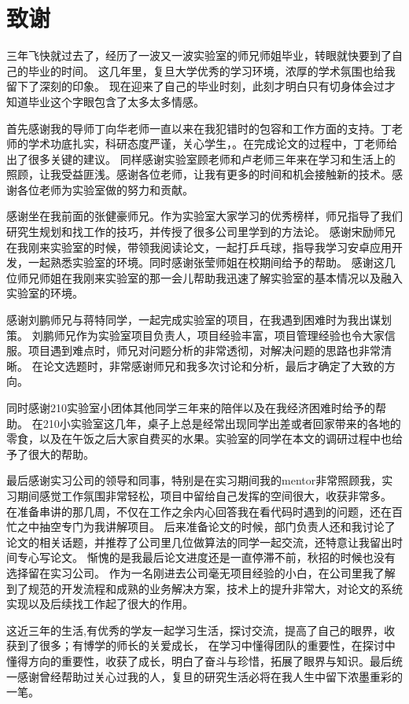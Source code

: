 \chapter*{致谢}

三年飞快就过去了，经历了一波又一波实验室的师兄师姐毕业，转眼就快要到了自己的毕业的时间。 
这几年里，复旦大学优秀的学习环境，浓厚的学术氛围也给我留下了深刻的印象。
现在迎来了自己的毕业时刻，此刻才明白只有切身体会过才知道毕业这个字眼包含了太多太多情感。

首先感谢我的导师丁向华老师一直以来在我犯错时的包容和工作方面的支持。丁老师的学术功底扎实，科研态度严谨，关心学生，。在完成论文的过程中，丁老师给出了很多关键的建议。
同样感谢实验室顾老师和卢老师三年来在学习和生活上的照顾，让我受益匪浅。感谢各位老师，让我有更多的时间和机会接触新的技术。感谢各位老师为实验室做的努力和贡献。

感谢坐在我前面的张健豪师兄。作为实验室大家学习的优秀榜样，师兄指导了我们研究生规划和找工作的技巧，并传授了很多公司里学到的方法论。
感谢宋励师兄在我刚来实验室的时候，带领我阅读论文，一起打乒乓球，指导我学习安卓应用开发，一起熟悉实验室的环境。同时感谢张莹师姐在校期间给予的帮助。
感谢这几位师兄师姐在我刚来实验室的那一会儿帮助我迅速了解实验室的基本情况以及融入实验室的环境。

感谢刘鹏师兄与蒋特同学，一起完成实验室的项目，在我遇到困难时为我出谋划策。
刘鹏师兄作为实验室项目负责人，项目经验丰富，项目管理经验也令大家信服。项目遇到难点时，师兄对问题分析的非常透彻，对解决问题的思路也非常清晰。
在论文选题时，非常感谢师兄和我多次讨论和分析，最后才确定了大致的方向。

同时感谢210实验室小团体其他同学三年来的陪伴以及在我经济困难时给予的帮助。
在210小实验室这几年，桌子上总是经常出现同学出差或者回家带来的各地的零食，以及在午饭之后大家自费买的水果。实验室的同学在本文的调研过程中也给予了很大的帮助。

最后感谢实习公司的领导和同事，特别是在实习期间我的mentor非常照顾我，实习期间感觉工作氛围非常轻松，项目中留给自己发挥的空间很大，收获非常多。
在准备串讲的那几周，不仅在工作之余内心回答我在看代码时遇到的问题，还在百忙之中抽空专门为我讲解项目。
后来准备论文的时候，部门负责人还和我讨论了论文的相关话题，并推荐了公司里几位做算法的同学一起交流，还特意让我留出时间专心写论文。
惭愧的是我最后论文进度还是一直停滞不前，秋招的时候也没有选择留在实习公司。
作为一名刚进去公司毫无项目经验的小白，在公司里我了解到了规范的开发流程和成熟的业务解决方案，技术上的提升非常大，对论文的系统实现以及后续找工作起了很大的作用。


这近三年的生活,有优秀的学友一起学习生活，探讨交流，提高了自己的眼界，收获到了很多；有博学的师长的关爱成长，
在学习中懂得团队的重要性，在探讨中懂得方向的重要性，收获了成长，明白了奋斗与珍惜，拓展了眼界与知识。最后统一感谢曾经帮助过关心过我的人，复旦的研究生活必将在我人生中留下浓墨重彩的一笔。